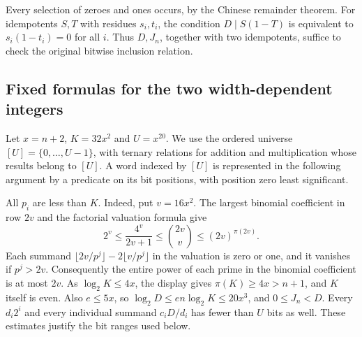 \documentclass[11pt,letterpaper]{article}
\numberwithin{equation}{section}
\begin{document}
Every selection of zeroes and ones occurs, by the Chinese remainder
theorem. For idempotents \(S,T\) with residues \(s_i,t_i\), the condition
\(D\mid S(1-T)\) is equivalent to \(s_i(1-t_i)=0\) for all \(i\).
Thus \(D,J_n\), together with two idempotents, suffice to check the original
bitwise inclusion relation.

\subsection{Fixed formulas for the two width-dependent integers}

Let \(x=n+2\), \(K=32x^2\) and \(U=x^{20}\). We use the ordered
universe \([U]=\{0,\ldots,U-1\}\), with ternary relations for addition
and multiplication whose results belong to \([U]\). A word indexed by
\([U]\) is represented in the following argument by a predicate on its
bit positions, with position zero least significant.

All \(p_i\) are less than \(K\). Indeed, put \(v=16x^2\). The largest
binomial coefficient in row \(2v\) and the factorial valuation formula give
\[
 2^v\le\frac{4^v}{2v+1}\le \binom{2v}{v}\le(2v)^{\pi(2v)}.
\]
Each summand \(\lfloor 2v/p^j\rfloor-2\lfloor v/p^j\rfloor\) in the
valuation is zero or one, and it vanishes if \(p^j>2v\). Consequently
the entire power of each prime in the binomial coefficient is at most
\(2v\). As \(\log_2 K\le4x\), the display gives
\(\pi(K)\ge 4x>n+1\), and \(K\) itself is even. Also \(e\le5x\), so
\(\log_2D\le en\log_2K\le20x^3\), and \(0\le J_n<D\).
Every \(d_i2^i\) and every individual summand \(c_iD/d_i\) has fewer
than \(U\) bits as well. These estimates justify the bit ranges used below.
\end{document}
